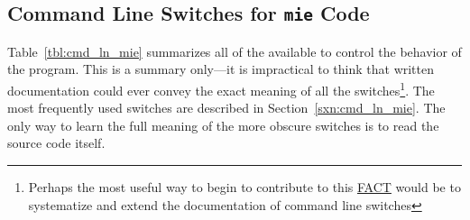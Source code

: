 \documentclass[12pt,twoside]{article}
\begin{document}
\subsection[Command Line Switches for \texttt{mie} Code]{Command Line Switches for \texttt{mie} Code}\label{sxn:apn_cmd_ln_mie}
Table~\ref{tbl:cmd_ln_mie} summarizes all of the  
available to control the behavior of the  program. 
This is a summary only---it is impractical to think that written 
documentation could ever convey the exact meaning of all the
switches\footnote{Perhaps the most useful way to begin to contribute
to this \href{http://dust.ess.uci.edu/facts}{FACT} would be to
systematize and extend the documentation of command line switches}.
The most frequently used switches are described in
Section~\ref{sxn:cmd_ln_mie}. 
The only way to learn the full meaning of the more obscure switches is
to read the source code itself.
\end{document}
